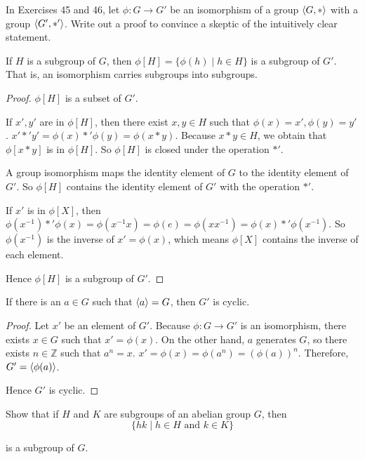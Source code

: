 In Exercises 45 and 46, let $\phi: G \to G'$ be an isomorphism of a group $\left\langle{G, *}\right\rangle$ with a group $\left\langle{G', *'}\right\rangle$. Write out a proof to convince a skeptic of the intuitively clear statement.

\newpage
\begin{exercise}
    If $H$ is a subgroup of $G$, then $\phi[H] = \{ \phi(h) \mid h\in H \}$ is a subgroup of $G'$. That is, an isomorphism carries subgroups into subgroups.
\end{exercise}

\begin{proof}
    $\phi[H]$ is a subset of $G'$.

    If $x', y'$ are in $\phi[H]$, then there exist $x, y\in H$ such that $\phi(x) = x', \phi(y) = y'$. $x' *' y' = \phi(x) *' \phi(y) = \phi(x * y)$. Because $x * y \in H$, we obtain that $\phi[x * y]$ is in $\phi[H]$. So $\phi[H]$ is closed under the operation $*'$.

    A group isomorphism maps the identity element of $G$ to the identity element of $G'$. So $\phi[H]$ contains the identity element of $G'$ with the operation $*'$.

    If $x'$ is in $\phi[X]$, then $\phi(x^{-1}) *' \phi(x) = \phi(x^{-1}x) = \phi(e) = \phi(xx^{-1}) = \phi(x) *' \phi(x^{-1})$. So $\phi(x^{-1})$ is the inverse of $x' = \phi(x)$, which means $\phi[X]$ contains the inverse of each element.

    Hence $\phi[H]$ is a subgroup of $G'$.
\end{proof}

\newpage
\begin{exercise}
    If there is an $a\in G$ such that $\left\langle{a}\right\rangle = G$, then $G'$ is cyclic.
\end{exercise}

\begin{proof}
    Let $x'$ be an element of $G'$. Because $\phi: G \to G'$ is an isomorphism, there exists $x\in G$ such that $x' = \phi(x)$. On the other hand, $a$ generates $G$, so there exists $n\in\mathbb{Z}$ such that $a^{n} = x$. $x' = \phi(x) = \phi(a^{n}) = {(\phi(a))}^{n}$. Therefore, $G' = \left\langle{\phi(a)}\right\rangle$.

    Hence $G'$ is cyclic.
\end{proof}

\newpage
\begin{exercise}
    Show that if $H$ and $K$ are subgroups of an abelian group $G$, then
    \[
        \{ hk \mid h\in H \text{ and } k\in K \}
    \]

    is a subgroup of $G$.
\end{exercise}

